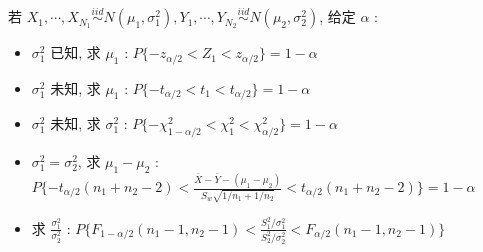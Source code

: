 \documentclass[UTF8, 12pt]{ctexart}
\begin{document}
	若 $ X_{1}, \cdots, X_{N_{1}} \overset{iid}{\sim} N(\mu_{1}, \sigma^{2}_{1}), Y_{1}, \cdots, Y_{N_{2}} \overset{iid}{\sim} N(\mu_{2}, \sigma^{2}_{2}) $, 给定 $ \alpha $ :
	\begin{itemize}[leftmargin = 4em]
		\item $ \sigma^{2}_{1} $ 已知, 求 $ \mu_{1} $ : $ P\{-z_{\alpha/2} < Z_{1} < z_{\alpha/2}\} = 1 - \alpha $
		\item $ \sigma^{2}_{1} $ 未知, 求 $ \mu_{1} $ : $ P\{-t_{\alpha/2} < t_{1} < t_{\alpha/2}\} = 1 - \alpha $
		\item $ \sigma^{2}_{1} $ 未知, 求 $ \sigma^{2}_{1} $ : $ P\{-\chi^{2}_{1-\alpha/2} < \chi^{2}_{1} < \chi^{2}_{\alpha/2}\} = 1 - \alpha $
		\item $ \sigma^{2}_{1} = \sigma^{2}_{2} $, 求 $ \mu_{1} - \mu_{2} $ : $ P\{-t_{\alpha/2}(n_{1}+n_{2}-2) < \frac{\overline{X}-\overline{Y}-(\mu_{1}-\mu_{2})}{S_{w}\sqrt{1/n_{1}+1/n_{2}}} < t_{\alpha/2}(n_{1}+n_{2}-2)\} = 1 - \alpha $
		\item 求 $ \frac{\sigma^{2}_{1}}{\sigma^{2}_{2}} $ : $ P\{F_{1-\alpha/2}(n_{1}-1, n_{2}-1) < \frac{S_{1}^{2}/\sigma^{2}_{1}}{S_{2}^{2}/\sigma^{2}_{2}} < F_{\alpha/2}(n_{1}-1, n_{2}-1) \} $
	\end{itemize}
\end{document}
